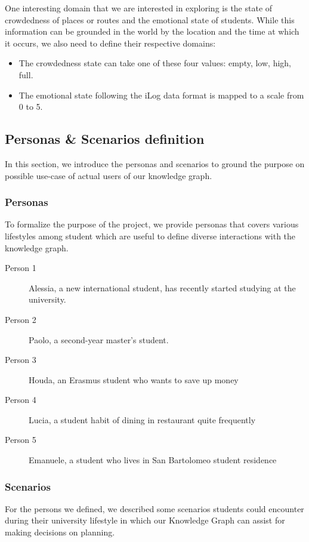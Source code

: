 One interesting domain that we are interested in exploring is the state of crowdedness of places or routes and the emotional state of students. While this information can be grounded in the world by the location and the time at which it occurs, we also need to define their respective domains:
\begin{itemize}
    \item The crowdedness state can take one of these four values: empty, low, high, full.
    \item The emotional state following the iLog data format is mapped to a scale from 0 to 5.
\end{itemize}
    
\subsection{Personas \& Scenarios definition}
In this section, we introduce the personas and scenarios to ground the purpose on possible use-case of actual users of our knowledge graph.

\subsubsection{Personas}
To formalize the purpose of the project, we provide personas that covers various lifestyles among student which are useful to define diverse interactions with the knowledge graph.

\begin{description}
    \item[Person 1] Alessia, a new international student, has recently started studying at the university.
    \item[Person 2] Paolo, a second-year master's student. 
    \item[Person 3] Houda, an Erasmus student who wants to save up money
    \item[Person 4] Lucia, a student habit of dining in restaurant quite frequently
    \item[Person 5] Emanuele, a student who lives in San Bartolomeo student residence
\end{description}

\subsubsection{Scenarios}
For the persons we defined, we described some scenarios students could encounter during their university lifestyle in which our Knowledge Graph can assist for making decisions on planning.

